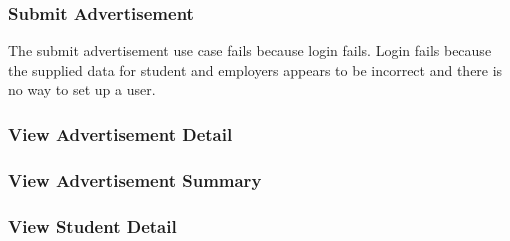 \documentclass[11pt]{l3deliverable}
\begin{document}
\subsubsection{Submit Advertisement}

The submit advertisement use case fails because login fails. Login fails 
because the supplied data for student and employers appears to be incorrect and 
there is no way to set up a user.

\subsubsection{View Advertisement Detail}

\subsubsection{View Advertisement Summary}

\subsubsection{View Student Detail}
\end{document}
